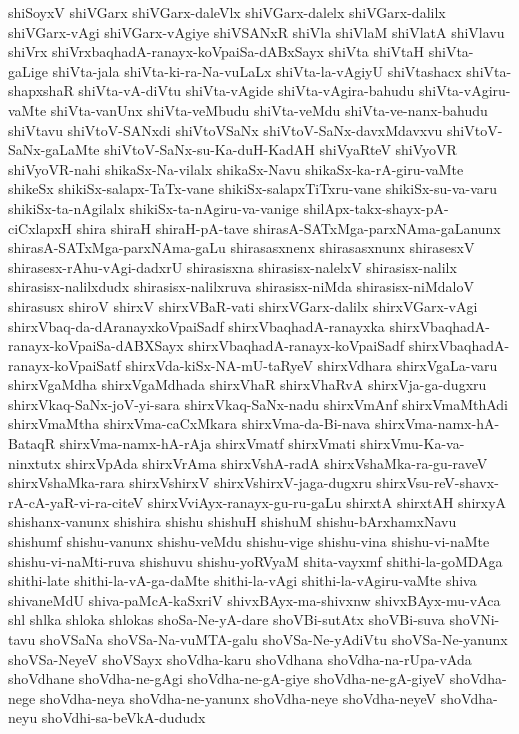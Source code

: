{shiSoyxV
shiVGarx
shiVGarx-daleVlx
shiVGarx-dalelx
shiVGarx-dalilx
shiVGarx-vAgi
shiVGarx-vAgiye
shiVSANxR
shiVla
shiVlaM
shiVlatA
shiVlavu
shiVrx
shiVrxbaqhadA-ranayx-koVpaiSa-dABxSayx
shiVta
shiVtaH
shiVta-gaLige
shiVta-jala
shiVta-ki-ra-Na-vuLaLx
shiVta-la-vAgiyU
shiVtashacx
shiVta-shapxshaR
shiVta-vA-diVtu
shiVta-vAgide
shiVta-vAgira-bahudu
shiVta-vAgiru-vaMte
shiVta-vanUnx
shiVta-veMbudu
shiVta-veMdu
shiVta-ve-nanx-bahudu
shiVtavu
shiVtoV-SANxdi
shiVtoVSaNx
shiVtoV-SaNx-davxMdavxvu
shiVtoV-SaNx-gaLaMte
shiVtoV-SaNx-su-Ka-duH-KadAH
shiVyaRteV
shiVyoVR
shiVyoVR-nahi
shikaSx-Na-vilalx
shikaSx-Navu
shikaSx-ka-rA-giru-vaMte
shikeSx
shikiSx-salapx-TaTx-vane
shikiSx-salapxTiTxru-vane
shikiSx-su-va-varu
shikiSx-ta-nAgilalx
shikiSx-ta-nAgiru-va-vanige
shilApx-takx-shayx-pA-ciCxlapxH
shira
shiraH
shiraH-pA-tave
shirasA-SATxMga-parxNAma-gaLanunx
shirasA-SATxMga-parxNAma-gaLu
shirasasxnenx
shirasasxnunx
shirasesxV
shirasesx-rAhu-vAgi-dadxrU
shirasisxna
shirasisx-nalelxV
shirasisx-nalilx
shirasisx-nalilxdudx
shirasisx-nalilxruva
shirasisx-niMda
shirasisx-niMdaloV
shirasusx
shiroV
shirxV
shirxVBaR-vati
shirxVGarx-dalilx
shirxVGarx-vAgi
shirxVbaq-da-dAranayxkoVpaiSadf
shirxVbaqhadA-ranayxka
shirxVbaqhadA-ranayx-koVpaiSa-dABXSayx
shirxVbaqhadA-ranayx-koVpaiSadf
shirxVbaqhadA-ranayx-koVpaiSatf
shirxVda-kiSx-NA-mU-taRyeV
shirxVdhara
shirxVgaLa-varu
shirxVgaMdha
shirxVgaMdhada
shirxVhaR
shirxVhaRvA
shirxVja-ga-dugxru
shirxVkaq-SaNx-joV-yi-sara
shirxVkaq-SaNx-nadu
shirxVmAnf
shirxVmaMthAdi
shirxVmaMtha
shirxVma-caCxMkara
shirxVma-da-Bi-nava
shirxVma-namx-hA-BataqR
shirxVma-namx-hA-rAja
shirxVmatf
shirxVmati
shirxVmu-Ka-va-ninxtutx
shirxVpAda
shirxVrAma
shirxVshA-radA
shirxVshaMka-ra-gu-raveV
shirxVshaMka-rara
shirxVshirxV
shirxVshirxV-jaga-dugxru
shirxVsu-reV-shavx-rA-cA-yaR-vi-ra-citeV
shirxVviAyx-ranayx-gu-ru-gaLu
shirxtA
shirxtAH
shirxyA
shishanx-vanunx
shishira
shishu
shishuH
shishuM
shishu-bArxhamxNavu
shishumf
shishu-vanunx
shishu-veMdu
shishu-vige
shishu-vina
shishu-vi-naMte
shishu-vi-naMti-ruva
shishuvu
shishu-yoRVyaM
shita-vayxmf
shithi-la-goMDAga
shithi-late
shithi-la-vA-ga-daMte
shithi-la-vAgi
shithi-la-vAgiru-vaMte
shiva
shivaneMdU
shiva-paMcA-kaSxriV
shivxBAyx-ma-shivxnw
shivxBAyx-mu-vAca
shl
shlka
shloka
shlokas
shoSa-Ne-yA-dare
shoVBi-sutAtx
shoVBi-suva
shoVNi-tavu
shoVSaNa
shoVSa-Na-vuMTA-galu
shoVSa-Ne-yAdiVtu
shoVSa-Ne-yanunx
shoVSa-NeyeV
shoVSayx
shoVdha-karu
shoVdhana
shoVdha-na-rUpa-vAda
shoVdhane
shoVdha-ne-gAgi
shoVdha-ne-gA-giye
shoVdha-ne-gA-giyeV
shoVdha-nege
shoVdha-neya
shoVdha-ne-yanunx
shoVdha-neye
shoVdha-neyeV
shoVdha-neyu
shoVdhi-sa-beVkA-dududx
}
